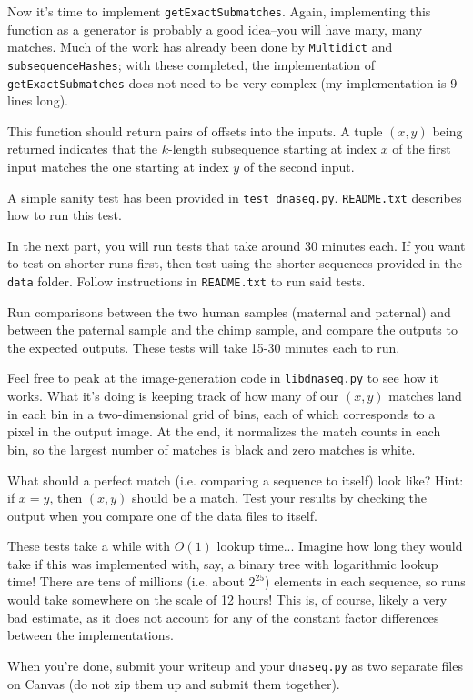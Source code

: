 \documentclass[12pt,twoside]{article}
\begin{document}
\begin{problems}
\begin{problemparts}
\problempart Now it's time to implement \texttt{getExactSubmatches}. Again, 
implementing this function as a generator is probably a good idea--you will have
many, many matches. Much of the work has already been done by \texttt{Multidict}
and \texttt{subsequenceHashes}; with these completed, the implementation of
\texttt{getExactSubmatches} does not need to be
very complex (my implementation is 9 lines long).

	This function should return pairs of offsets into the inputs. A tuple $(x, y)$
	being returned indicates that the $k$-length subsequence starting at index $x$
	of the first input matches the one starting at index $y$ of the second input.

	A simple sanity test has been provided in \texttt{test\_dnaseq.py}.
	\texttt{README.txt} describes how to run this test.

	In the next part, you will run tests that take around 30 minutes each.
	If you want to test on shorter runs first, then test using the shorter
	sequences provided in the \texttt{data} folder. Follow instructions in
	\texttt{README.txt} to run said tests.

\problempart Run comparisons between the two human samples (maternal and paternal)
and between the paternal sample and the chimp sample, and compare the outputs to
the expected outputs. These tests will take 15-30 minutes each to run.

	Feel free to peak at the image-generation code in \texttt{libdnaseq.py} to see
	how it works. What it's doing is keeping track of how many of our $(x, y)$
	matches land in each bin in a two-dimensional grid of bins, each of which
	corresponds to a pixel in the output image. At the end, it normalizes the
	match counts in each bin, so the largest number of matches is black and zero
	matches is white.

	What should a perfect match (i.e. comparing a sequence to itself) look like?
	Hint: if $x=y$, then $(x, y)$ should be a match. Test your results by checking
	the output when you compare one of the data files to itself.

	These tests take a while with $O(1)$ lookup time... Imagine how long they would
	take if this was implemented with, say, a binary tree with logarithmic lookup
	time! There are tens of millions (i.e. about $2^{25}$) elements in each sequence,
	so runs would take somewhere on the scale of 12 hours! This is, of course,
	likely a very bad estimate, as it does not account for any of the constant
	factor differences between the implementations.

\end{problemparts}

When you're done, submit your writeup and your \texttt{dnaseq.py} as two separate
files on Canvas (do not zip them up and submit them together).

\end{problems}
\end{document}
